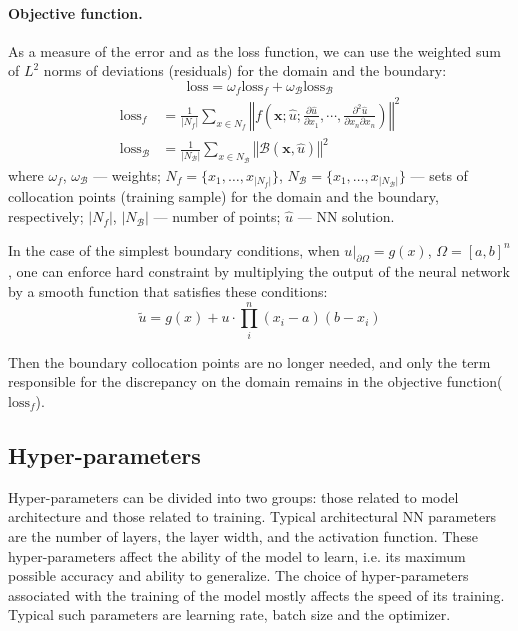 \documentclass[reprint,
superscriptaddress,
amsmath,amssymb,aps,showkeys,showpacs,
twoside,final,secnumarabic,%
nofootinbib]{revtex4-2}
\begin{document}
\paragraph{Objective function.}
As a measure of the error and as the loss function, we can use the weighted sum of $L^2$ norms of deviations (residuals) for the domain and the boundary:
\[\mathrm{loss} = \omega_f \mathrm{loss}_f + \omega_\mathcal{B} \mathrm{loss}_\mathcal{B}\]
\begin{align*}
\mathrm{loss}_f &= \frac{1}{|N_f|} \sum \limits_{x \in N_f} \left\Vert f \left( \mathbf{x}; \hat{u}; \frac{\partial \hat{u}}{\partial x_1}, \cdots, \frac{\partial^2 \hat{u}}{\partial x_n \partial x_n} \right) \right\Vert^2\\
\mathrm{loss}_\mathcal{B} &= \frac{1}{|N_\mathcal{B}|} \sum \limits_{x \in N_\mathcal{B}} \left\Vert \mathcal{B}(\mathbf{x}, \hat{u}) \right\Vert^2
\end{align*}
where $\omega_f$, $\omega_\mathcal{B}$ — weights; $N_f = \lbrace x_1, \ldots, x_{|N_f|} \rbrace$, $N_\mathcal{B} = \lbrace x_1, \ldots, x_{|N_\mathcal{B}|} \rbrace$ — sets of collocation points (training sample) for the domain and the boundary, respectively; $|N_f|$, $|N_\mathcal{B}|$ — number of points; $\hat{u}$ — NN solution.

In the case of the simplest boundary conditions, when $u|_{\partial \Omega} = g(x)$, $\Omega = [a, b]^n$, one can enforce hard constraint by multiplying the output of the neural network by a smooth function that satisfies these conditions:
\[\tilde{u} = g(x) + u \cdot \prod \limits_i^n (x_i - a)(b - x_i)\]

Then the boundary collocation points are no longer needed, and only the term responsible for the discrepancy on the domain remains in the objective function($\mathrm{loss}_f$).

\subsection{Hyper-parameters}
Hyper-parameters can be divided into two groups: those related to model architecture and those related to training. Typical architectural NN parameters are the number of layers, the layer width, and the activation function. These hyper-parameters affect the ability of the model to learn, i.e. its maximum possible accuracy and ability to generalize. The choice of hyper-parameters associated with the training of the model mostly affects the speed of its training. Typical such parameters are learning rate, batch size and the optimizer.
\end{document}
